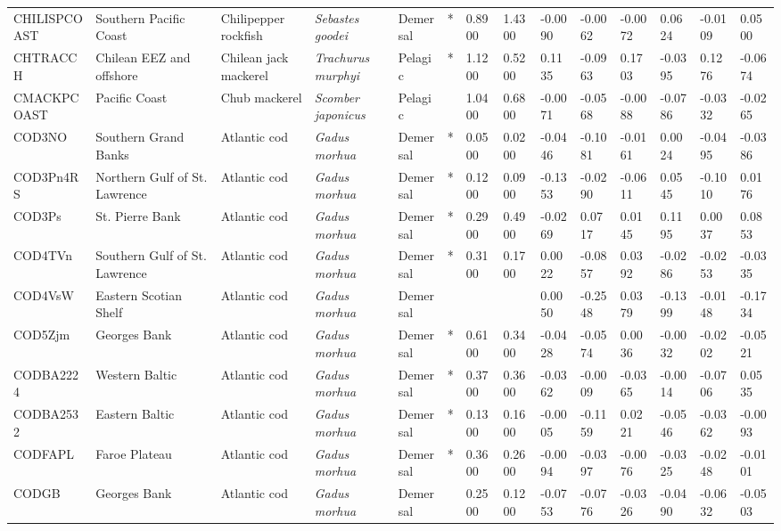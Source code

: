 \begin{longtable}{p{2.6cm}p{1.9cm}p{1.7cm}p{1.6cm}p{1cm}p{0.3cm}p{1cm}p{1cm}p{1cm}p{1.1cm}p{1cm}p{1.1cm}p{1cm}p{1.1cm}}
  CHILISPCOAST & Southern Pacific Coast & Chilipepper rockfish & \textit{Sebastes goodei} & Demersal & * & 0.8900 & 1.4300 & -0.0090 & -0.0062 & -0.0072 & 0.0624 & -0.0109 & 0.0500 \\ 
  CHTRACCH & Chilean EEZ and offshore & Chilean jack mackerel & \textit{Trachurus murphyi} & Pelagic & * & 1.1200 & 0.5200 & 0.1135 & -0.0963 & 0.1703 & -0.0395 & 0.1276 & -0.0674 \\ 
  CMACKPCOAST & Pacific Coast & Chub mackerel & \textit{Scomber japonicus} & Pelagic &   & 1.0400 & 0.6800 & -0.0071 & -0.0568 & -0.0088 & -0.0786 & -0.0332 & -0.0265 \\ 
  COD3NO & Southern Grand Banks & Atlantic cod & \textit{Gadus morhua} & Demersal & * & 0.0500 & 0.0200 & -0.0446 & -0.1081 & -0.0161 & 0.0024 & -0.0495 & -0.0386 \\ 
  COD3Pn4RS & Northern Gulf of St. Lawrence & Atlantic cod & \textit{Gadus morhua} & Demersal & * & 0.1200 & 0.0900 & -0.1353 & -0.0290 & -0.0611 & 0.0545 & -0.1010 & 0.0176 \\ 
  COD3Ps & St. Pierre Bank & Atlantic cod & \textit{Gadus morhua} & Demersal & * & 0.2900 & 0.4900 & -0.0269 & 0.0717 & 0.0145 & 0.1195 & 0.0037 & 0.0853 \\ 
  COD4TVn & Southern Gulf of St. Lawrence & Atlantic cod & \textit{Gadus morhua} & Demersal & * & 0.3100 & 0.1700 & 0.0022 & -0.0857 & 0.0392 & -0.0286 & -0.0253 & -0.0335 \\ 
  COD4VsW & Eastern Scotian Shelf & Atlantic cod & \textit{Gadus morhua} & Demersal &  &  &  & 0.0050 & -0.2548 & 0.0379 & -0.1399 & -0.0148 & -0.1734 \\ 
  COD5Zjm & Georges Bank & Atlantic cod & \textit{Gadus morhua} & Demersal & * & 0.6100 & 0.3400 & -0.0428 & -0.0574 & 0.0036 & -0.0032 & -0.0202 & -0.0521 \\ 
  CODBA2224 & Western Baltic & Atlantic cod & \textit{Gadus morhua} & Demersal & * & 0.3700 & 0.3600 & -0.0362 & -0.0009 & -0.0365 & -0.0014 & -0.0706 & 0.0535 \\ 
  CODBA2532 & Eastern Baltic & Atlantic cod & \textit{Gadus morhua} & Demersal & * & 0.1300 & 0.1600 & -0.0005 & -0.1159 & 0.0221 & -0.0546 & -0.0362 & -0.0093 \\ 
  CODFAPL & Faroe Plateau & Atlantic cod & \textit{Gadus morhua} & Demersal & * & 0.3600 & 0.2600 & -0.0094 & -0.0397 & -0.0076 & -0.0325 & -0.0248 & -0.0101 \\ 
  CODGB & Georges Bank & Atlantic cod & \textit{Gadus morhua} & Demersal &   & 0.2500 & 0.1200 & -0.0753 & -0.0776 & -0.0326 & -0.0490 & -0.0632 & -0.0503 \\ 

\end{longtable}
